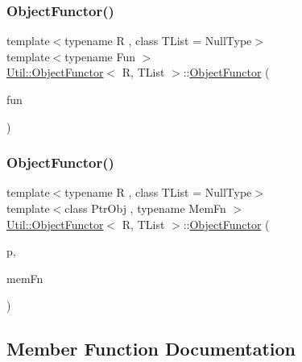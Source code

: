 \subsubsection{\texorpdfstring{ObjectFunctor()}{ObjectFunctor()}\hspace{0.1cm}{\footnotesize\ttfamily [9/10]}}
{\footnotesize\ttfamily template$<$typename R , class T\+List  = Null\+Type$>$ \\
template$<$typename Fun $>$ \\
\mbox{\hyperlink{classUtil_1_1ObjectFunctor}{Util\+::\+Object\+Functor}}$<$ R, T\+List $>$\+::\mbox{\hyperlink{classUtil_1_1ObjectFunctor}{Object\+Functor}} (\begin{DoxyParamCaption}\item[{Fun}]{fun }\end{DoxyParamCaption})\hspace{0.3cm}{\ttfamily [inline]}}

\mbox{\label{classUtil_1_1ObjectFunctor_a346fdbed7070eeafec9270c9a5a766ec}} 
\subsubsection{\texorpdfstring{ObjectFunctor()}{ObjectFunctor()}\hspace{0.1cm}{\footnotesize\ttfamily [10/10]}}
{\footnotesize\ttfamily template$<$typename R , class T\+List  = Null\+Type$>$ \\
template$<$class Ptr\+Obj , typename Mem\+Fn $>$ \\
\mbox{\hyperlink{classUtil_1_1ObjectFunctor}{Util\+::\+Object\+Functor}}$<$ R, T\+List $>$\+::\mbox{\hyperlink{classUtil_1_1ObjectFunctor}{Object\+Functor}} (\begin{DoxyParamCaption}\item[{const Ptr\+Obj \&}]{p,  }\item[{Mem\+Fn}]{mem\+Fn }\end{DoxyParamCaption})\hspace{0.3cm}{\ttfamily [inline]}}



\subsection{Member Function Documentation}
\mbox{\label{classUtil_1_1ObjectFunctor_a47ff83bbdf075aefe2ee26aafafd88a1}} 
